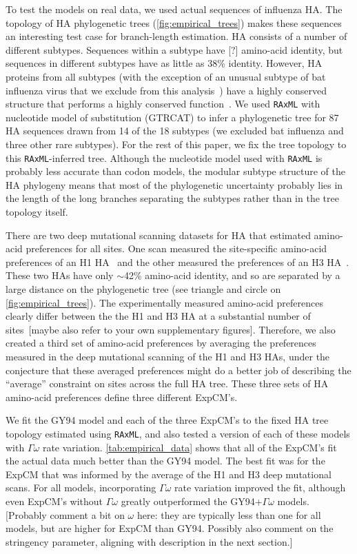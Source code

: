 \documentclass[11pt]{article}
\newcommand\jdbcomment[1]{{\color{red}[#1]}}
\begin{document}
To test the models on real data, we used actual sequences of influenza HA. 
The topology of HA phylogenetic trees (\ref{fig:empirical_trees}) makes these sequences an interesting test case for branch-length estimation.
HA consists of a number of different subtypes.
Sequences within a subtype have \jdbcomment{?} amino-acid identity, but sequences in different subtypes have as little as 38\% identity.
However, HA proteins from all subtypes (with the exception of an unusual subtype of bat influenza virus that we exclude from this analysis~\citep{zhu2013hemagglutinin,hoffmann2016hemagglutinin,sun2013bat}) have a highly conserved structure that performs a highly conserved function~\citep{ha2002h5,russell2004h1}.
We used \texttt{RAxML} with nucleotide model of substitution (GTRCAT) to infer a phylogenetic tree for 87 HA sequences drawn from 14 of the 18 subtypes (we excluded bat influenza and three other rare subtypes).
For the rest of this paper, we fix the tree topology to this \texttt{RAxML}-inferred tree.
Although the nucleotide model used with \texttt{RAxML} is probably less accurate than codon models, the modular subtype structure of the HA phylogeny means that most of the phylogenetic uncertainty probably lies in the length of the long branches separating the subtypes rather than in the tree topology itself.

There are two deep mutational scanning datasets for HA that estimated amino-acid preferences for all sites.
One scan measured the site-specific amino-acid preferences of an H1 HA~\citep{doud2016accurate} and the other measured the preferences of an H3 HA~\citep{lee2018deep}.
These two HAs have only $\sim$42\% amino-acid identity, and so are separated by a large distance on the phylogenetic tree (see triangle and circle on \ref{fig:empirical_trees}).
The experimentally measured amino-acid preferences clearly differ between the the H1 and H3 HA at a substantial number of sites~\citep{lee2018deep}\jdbcomment{maybe also refer to your own supplementary figures}.
Therefore, we also created a third set of amino-acid preferences by averaging the preferences measured in the deep mutational scanning of the H1 and H3 HAs, under the conjecture that these averaged preferences might do a better job of describing the ``average'' constraint on sites across the full HA tree.
These three sets of HA amino-acid preferences define three different ExpCM's.
 
We fit the GY94 model and each of the three ExpCM's to the fixed HA tree topology estimated using \texttt{RAxML}, and also tested a version of each of these models with $\Gamma\omega$ rate variation.
\ref{tab:empirical_data} shows that all of the ExpCM's fit the actual data much better than the GY94 model.
The best fit was for the ExpCM that was informed by the average of the H1 and H3 deep mutational scans.
For all models, incorporating $\Gamma\omega$ rate variation improved the fit, although even ExpCM's without $\Gamma\omega$ greatly outperformed the GY94+$\Gamma\omega$ models.
\jdbcomment{Probably comment a bit on $\omega$ here: they are typically less than one for all models, but are higher for ExpCM than GY94. Possibly also comment on the stringency parameter, aligning with description in the next section.}
\end{document}
